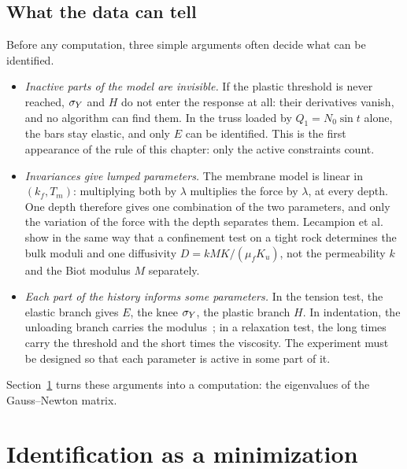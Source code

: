 \subsection{What the data can tell}\label{ssec:id-tell}
%
Before any computation, three simple arguments often decide what can be
identified.
\begin{itemize}
  \item \emph{Inactive parts of the model are invisible.} If the plastic
  threshold is never reached, $\sigma_{Y}$ and $H$ do not enter the response at all:
  their derivatives vanish, and no algorithm can find them. In the truss
  loaded by $Q_1=N_0\sin t$ alone, the bars stay elastic, and only $E$ can be
  identified. This is the first appearance of the rule of this chapter:
  only the active constraints count.
  \item \emph{Invariances give lumped parameters.} The membrane model is
  linear in $(k_f,T_m)$: multiplying both by $\lambda$ multiplies the force by
  $\lambda$, at every depth. One depth therefore gives one combination of the
  two parameters, and only the variation of the force with the depth
  separates them. Lecampion et al.~\cite{LecampionConstantinescuMalinsky2006}
  show in the same way that a confinement test on a tight rock determines the
  bulk moduli and one diffusivity $D=kMK/(\mu_fK_u)$, not the permeability $k$
  and the Biot modulus $M$ separately.
  \item \emph{Each part of the history informs some parameters.} In the tension
  test, the elastic branch gives $E$, the knee $\sigma_{Y}$, the plastic branch $H$. In
  indentation, the unloading branch carries the modulus~\cite{ConstantinescuTardieu2001b};
  in a relaxation test, the long times carry the threshold and the short times
  the viscosity. The experiment must be designed so that each parameter is
  active in some part of it.
\end{itemize}
Section~\ref{sec:id-min} turns these arguments into a computation: the
eigenvalues of the Gauss--Newton matrix.

\section{Identification as a minimization}\label{sec:id-min}
%
